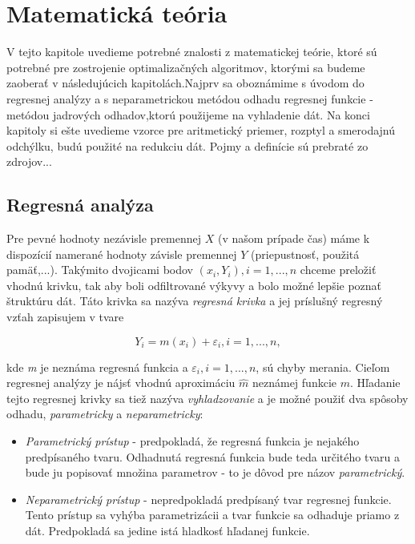\chapter{Matematická teória}

V tejto kapitole uvedieme potrebné znalosti z matematickej teórie, ktoré sú potrebné pre zostrojenie optimalizačných algoritmov, ktorými sa budeme zaoberať v následujúcich kapitolách.Najprv sa oboznámime s úvodom do regresnej analýzy a s neparametrickou metódou odhadu regresnej funkcie - metódou jadrových odhadov,ktorú použijeme na vyhladenie dát. Na konci kapitoly si ešte uvedieme vzorce pre aritmetický priemer, rozptyl a smerodajnú odchýlku, budú použité na redukciu dát. Pojmy a definície sú prebraté zo zdrojov...


\section{Regresná analýza}
Pre pevné hodnoty nezávisle premennej $X$ (v našom prípade čas)  máme k dispozícií namerané hodnoty závisle premennej $Y$ (priepustnosť, použitá pamäť,...). Takýmito dvojicami bodov $(x_i, Y_i), i = 1,...,n$ chceme preložiť vhodnú krivku, tak aby boli odfiltrované výkyvy a bolo možné lepšie poznať štruktúru dát. Táto krivka sa nazýva \textit{regresná krivka} a jej príslušný regresný vzťah zapisujem v tvare

\begin{equation}
Y_i = m(x_i) + \varepsilon _i, i=1,...,n,
\end{equation}

kde \textit{m} je neznáma regresná funkcia a $\varepsilon _i, i = 1,...,n$, sú chyby merania. Cieľom regresnej analýzy je nájsť vhodnú aproximáciu $\hat{m}$ neznámej funkcie $m$. Hľadanie tejto regresnej krivky sa tiež nazýva \textit{vyhladzovanie} a je možné použiť dva spôsoby odhadu, \textit{parametricky} a \textit{neparametricky}:
\begin{itemize}
\item \textit{Parametrický prístup} - predpokladá, že regresná funkcia je nejakého predpísaného tvaru. Odhadnutá regresná funkcia bude teda určitého tvaru a bude ju popisovať množina parametrov - to je dôvod pre názov \textit{parametrický}.
\item \textit{Neparametrický prístup} - nepredpokladá predpísaný tvar regresnej funkcie. Tento prístup sa vyhýba parametrizácii a tvar funkcie sa odhaduje priamo z dát. Predpokladá sa jedine istá hladkosť hľadanej funkcie.
\end{itemize}

